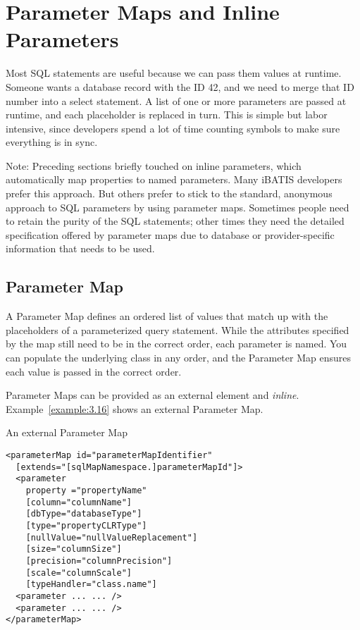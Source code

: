 \chapter{Parameter Maps and Inline Parameters}\label{section:3.4}
Most SQL statements are useful because we can pass them values at runtime.
Someone wants a database record with the ID 42, and we need to merge that ID
number into a select statement. A list of one or more parameters are passed at
runtime, and each placeholder is replaced in turn. This is simple but labor
intensive, since developers spend a lot of time counting symbols to make sure
everything is in sync.

\begin{mybox}{Note:}
Preceding sections briefly touched on inline parameters, which automatically
map properties to named parameters. Many iBATIS developers prefer this
approach. But others prefer to stick to the standard, anonymous approach to
SQL parameters by using parameter maps. Sometimes people need to retain the
purity of the SQL statements; other times they need the detailed specification
offered by parameter maps due to database or provider-specific information
that needs to be used.
\end{mybox}

\section{Parameter Map}
A Parameter Map defines an ordered list of values that match up with the
placeholders of a parameterized query statement. While the attributes
specified by the map still need to be in the correct order, each parameter is
named. You can populate the underlying class in any order, and the Parameter
Map ensures each value is passed in the correct order.

Parameter Maps can be provided as an external element and \emph{inline}.
Example~\ref{example:3.16} shows an external Parameter Map.

\begin{example}\label{example:3.16}
An external Parameter Map
\begin{verbatim}
<parameterMap id="parameterMapIdentifier"
  [extends="[sqlMapNamespace.]parameterMapId"]>
  <parameter
    property ="propertyName"
    [column="columnName"]
    [dbType="databaseType"]
    [type="propertyCLRType"]
    [nullValue="nullValueReplacement"]
    [size="columnSize"]
    [precision="columnPrecision"]
    [scale="columnScale"]
    [typeHandler="class.name"]
  <parameter ... ... />
  <parameter ... ... />
</parameterMap>
\end{verbatim}
\end{example}

